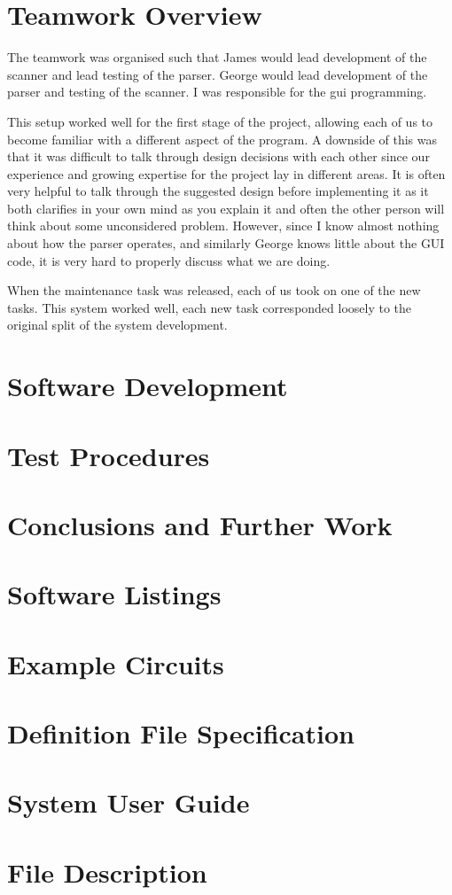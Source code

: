 \documentclass[a4paper,10pt]{article}  %
\begin{document}
\section{Teamwork Overview}
\label{sec:teamwork-overview}

The teamwork was organised such that James would lead development of
the scanner and lead testing of the parser. George would lead
development of the parser and testing of the scanner. I was
responsible for the gui programming.

This setup worked well for the first stage of the project, allowing
each of us to become familiar with a different aspect of the
program. A downside of this was that it was difficult to talk through
design decisions with each other since our experience and growing
expertise for the project lay in different areas. It is often very
helpful to talk through the suggested design before implementing it as
it both clarifies in your own mind as you explain it and often the
other person will think about some unconsidered problem. However,
since I know almost nothing about how the parser operates, and
similarly George knows little about the GUI code, it is very hard to
properly discuss what we are doing.

When the maintenance task was released, each of us took on one of the
new tasks. This system worked well, each new task corresponded loosely
to the original split of the system development.

\section{Software Development}
\label{sec:software-development}

\section{Test Procedures}
\label{sec:test-procedures}

\section{Conclusions and Further Work}
\label{sec:concl-furth-work}

\appendix

\section{Software Listings}
\label{sec:software-listings}

\section{Example Circuits}
\label{sec:example-circuits}

\section{Definition File Specification}
\label{sec:defin-file-spec}

\section{System User Guide}
\label{sec:system-user-guide}

\section{File Description}
\label{sec:file-description}
\end{document}
